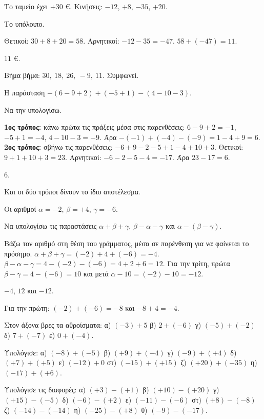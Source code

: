 \tixero Το ταμείο έχει $+30$ €. Κινήσεις: $-12$, $+8$, $-35$, $+20$.\par
\tithelo Το υπόλοιπο.\par
\possindeo Θετικοί: $30+8+20=58$. Αρνητικοί: $-12-35=-47$. $58+(-47)=11$.\par
\apantisi $11$ €.\par
\elegxos Βήμα βήμα: $30,\ 18,\ 26,\ -9,\ 11$. Συμφωνεί.

\tixero Η παράσταση $-(6-9+2)+(-5+1)-(4-10-3)$.\par
\tithelo Να την υπολογίσω.\par
\possindeo \textbf{1ος τρόπος:} κάνω πρώτα τις πράξεις μέσα στις παρενθέσεις: $6-9+2=-1$, $-5+1=-4$, $4-10-3=-9$. Άρα $-(-1)+(-4)-(-9)=1-4+9=6$. \textbf{2ος τρόπος:} σβήνω τις παρενθέσεις: $-6+9-2-5+1-4+10+3$. Θετικοί: $9+1+10+3=23$. Αρνητικοί: $-6-2-5-4=-17$. Άρα $23-17=6$.\par
\apantisi $6$.\par
\elegxos Και οι δύο τρόποι δίνουν το ίδιο αποτέλεσμα.

\tixero Οι αριθμοί $\alpha=-2$, $\beta=+4$, $\gamma=-6$.\par
\tithelo Να υπολογίσω τις παραστάσεις $\alpha+\beta+\gamma$, $\beta-\alpha-\gamma$ και $\alpha-(\beta-\gamma)$.\par
\possindeo Βάζω τον αριθμό στη θέση του γράμματος, μέσα σε παρένθεση για να φαίνεται το πρόσημο. $\alpha+\beta+\gamma=(-2)+4+(-6)=-4$. $\beta-\alpha-\gamma=4-(-2)-(-6)=4+2+6=12$. Για την τρίτη, πρώτα $\beta-\gamma=4-(-6)=10$ και μετά $\alpha-10=(-2)-10=-12$.\par
\apantisi $-4$, $12$ και $-12$.\par
\elegxos Για την πρώτη: $(-2)+(-6)=-8$ και $-8+4=-4$.



\ex Στον άξονα βρες τα αθροίσματα: α) $(-3)+5$ \quad β) $2+(-6)$ \quad γ) $(-5)+(-2)$ \quad δ) $7+(-7)$ \quad ε) $0+(-4)$.

\ex Υπολόγισε: α) $(-8)+(-5)$ \quad β) $(+9)+(-4)$ \quad γ) $(-9)+(+4)$ \quad δ) $(+7)+(+5)$ \quad ε) $(-12)+0$ \quad στ) $(-15)+(+15)$ \quad ζ) $(+20)+(-35)$ \quad η) $(-17)+(+6)$.

\ex Υπολόγισε τις διαφορές: α) $(+3)-(+1)$ \quad β) $(+10)-(+20)$ \quad γ) $(+15)-(-5)$ \quad δ) $(-6)-(+2)$ \quad ε) $(-11)-(-6)$ \quad στ) $(+8)-(-8)$ \quad ζ) $(-14)-(-14)$ \quad η) $(-25)-(+8)$ \quad θ) $(-9)-(-17)$.

